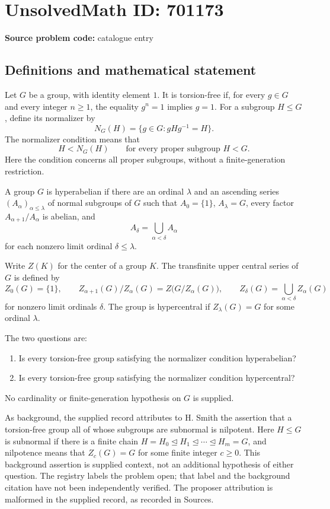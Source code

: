 \documentclass[11pt]{article}
\begin{document}
\section*{UnsolvedMath ID: 701173}
\textbf{Source problem code:} catalogue entry
\subsection{Definitions and mathematical statement}
Let \(G\) be a group, with identity element \(1\). It is torsion-free if, for every \(g\in G\) and every integer \(n\geq 1\), the equality \(g^n=1\) implies \(g=1\). For a subgroup \(H\leq G\), define its normalizer by
\[
N_G(H)=\{g\in G:gHg^{-1}=H\}.
\]
The normalizer condition means that
\[
H<N_G(H)\qquad\text{for every proper subgroup }H<G.
\]
Here the condition concerns all proper subgroups, without a finite-generation restriction.

A group \(G\) is hyperabelian if there are an ordinal \(\lambda\) and an ascending series \((A_\alpha)_{\alpha\leq\lambda}\) of normal subgroups of \(G\) such that \(A_0=\{1\}\), \(A_\lambda=G\), every factor \(A_{\alpha+1}/A_\alpha\) is abelian, and
\[
A_\delta=\bigcup_{\alpha<\delta}A_\alpha
\]
for each nonzero limit ordinal \(\delta\leq\lambda\).

Write \(Z(K)\) for the center of a group \(K\). The transfinite upper central series of \(G\) is defined by
\[
Z_0(G)=\{1\},\qquad
Z_{\alpha+1}(G)/Z_\alpha(G)=Z\bigl(G/Z_\alpha(G)\bigr),
\qquad
Z_\delta(G)=\bigcup_{\alpha<\delta}Z_\alpha(G)
\]
for nonzero limit ordinals \(\delta\). The group is hypercentral if \(Z_\lambda(G)=G\) for some ordinal \(\lambda\).

The two questions are:
\begin{enumerate}
\item[(a)] Is every torsion-free group satisfying the normalizer condition hyperabelian?
\item[(b)] Is every torsion-free group satisfying the normalizer condition hypercentral?
\end{enumerate}
No cardinality or finite-generation hypothesis on \(G\) is supplied.

As background, the supplied record attributes to H. Smith the assertion that a torsion-free group all of whose subgroups are subnormal is nilpotent. Here \(H\leq G\) is subnormal if there is a finite chain \(H=H_0\trianglelefteq H_1\trianglelefteq\cdots\trianglelefteq H_m=G\), and nilpotence means that \(Z_c(G)=G\) for some finite integer \(c\geq0\). This background assertion is supplied context, not an additional hypothesis of either question. The registry labels the problem open; that label and the background citation have not been independently verified. The proposer attribution is malformed in the supplied record, as recorded in Sources.
\end{document}
